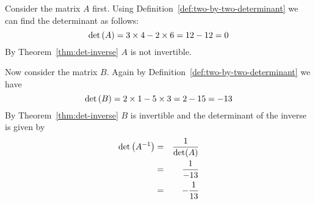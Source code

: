 \begin{solution}
Consider the matrix $A$ first. Using Definition~\ref{def:two-by-two-determinant} we can find the determinant as follows:
\[
\det \left(A \right) = 3 \times 4 - 2 \times 6 = 12 - 12 = 0
\]
By Theorem~\ref{thm:det-inverse} $A$ is not invertible.

Now consider the matrix $B$. Again by Definition~\ref{def:two-by-two-determinant} we have 
\[
\det \left(B\right) = 2 \times 1 - 5 \times 3 = 2 - 15 = -13
\]
By Theorem~\ref{thm:det-inverse} $B$ is invertible and the determinant of the inverse is given by 
\begin{eqnarray*}
\det \left(A^{-1} \right) &=& \frac{1}{\det(A)} \\
&=& \frac{1}{-13} \\
&=& -\frac{1}{13}
\end{eqnarray*}

\end{solution}
